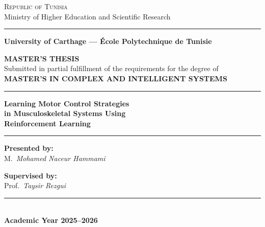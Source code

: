 \begin{titlepage}
\begin{center}

{\small\textsc{Republic of Tunisia}\\
Ministry of Higher Education and Scientific Research}

\vspace{0.3cm}
\rule{\textwidth}{1.5pt}
\vspace{0.2cm}

{\large\bfseries\color{black}
University of Carthage --- École Polytechnique de Tunisie \\[4pt]}

\vspace{1.2cm}

{\Large\bfseries\color{black} MASTER'S THESIS}\\[0.3cm]
{\normalsize Submitted in partial fulfillment of the requirements for the degree of}\\[0.3cm]
{\large\bfseries\color{black}
MASTER'S IN COMPLEX AND INTELLIGENT SYSTEMS}

\vspace{1.2cm}
\rule{\textwidth}{0.8pt}
\vspace{0.5cm}

{\LARGE\bfseries\color{black}
Learning Motor Control Strategies \\[6pt]
in Musculoskeletal Systems Using \\[6pt]
Reinforcement Learning\\[6pt]
}

\vspace{0.5cm}
\rule{\textwidth}{0.8pt}

\vspace{1.5cm}
\begin{minipage}[t]{0.48\textwidth}
\raggedright
\textbf{Presented by:}\\[6pt]
{\large M.~\textit{Mohamed Naceur Hammami}}
\end{minipage}
\hfill
\begin{minipage}[t]{0.48\textwidth}
\raggedleft
\textbf{Supervised by:}\\[6pt]
Prof.~\textit{Taysir Rezgui}
\end{minipage}

\vfill
\rule{\textwidth}{0.8pt}\\[0.3cm]
{\large\bfseries Academic Year 2025--2026}

\end{center}
\end{titlepage}

